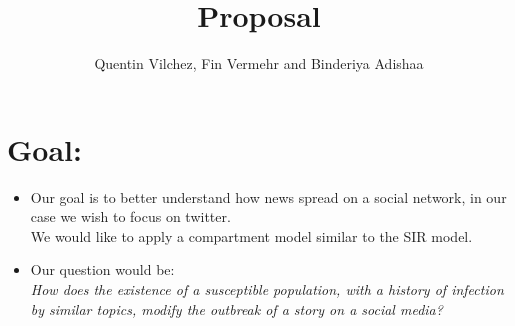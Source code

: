 \documentclass{article}
\author{Quentin Vilchez, Fin Vermehr and Binderiya Adishaa}
\title{Proposal}
\begin{document}
\maketitle
\usetikzlibrary{arrows,automata}
\section{Goal:}
\begin{itemize}
\item Our goal is to better understand how news spread on a social network, in our case we wish to focus on twitter. \\
We would like to apply a compartment model similar to the SIR model.
\item Our question would be:
\\ \textit{How does the existence of a susceptible population, with a history of infection by similar topics, modify the outbreak of a story on a social media?}
\end{itemize}
\end{document}
